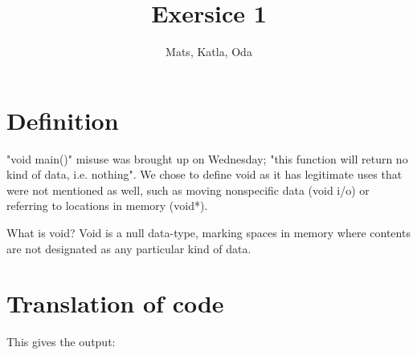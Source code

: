 \documentclass{article}
\title{Exersice 1}
\author{Mats, Katla, Oda}
\begin{document}
\maketitle

\section{Definition}

"void main()" misuse was brought up on Wednesday; "this function will return no kind of data, i.e. nothing". We chose to define void as it has legitimate uses that were not mentioned as well, such as moving nonspecific data (void i/o) or referring to locations in memory (void*).

What is void? Void is a null data-type, marking spaces in memory where contents are not designated as any particular kind of data.

\section{Translation of code}



This gives the output:


\end{document}
